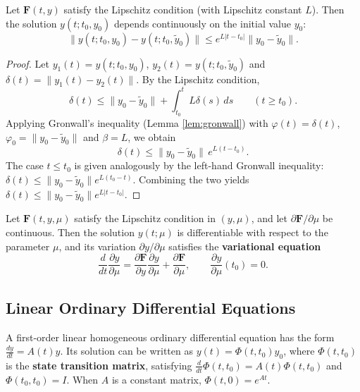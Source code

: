 \begin{proposition}\label{prop:continuous_dependence}
Let $\mathbf{F}(t, y)$ satisfy the Lipschitz condition (with Lipschitz constant $L$). Then the solution $y(t; t_0, y_0)$ depends continuously on the initial value $y_0$:
\[
\|y(t; t_0, y_0) - y(t; t_0, \tilde{y}_0)\| \le e^{L|t-t_0|} \|y_0 - \tilde{y}_0\|.
\]
\end{proposition}

\begin{proof}
Let $y_1(t) = y(t; t_0, y_0)$, $y_2(t) = y(t; t_0, \tilde{y}_0)$ and $\delta(t) = \|y_1(t) - y_2(t)\|$. By the Lipschitz condition,
\[
\delta(t) \le \|y_0 - \tilde{y}_0\| + \int_{t_0}^t L\delta(s)\,ds \qquad (t \ge t_0).
\]
Applying Gronwall's inequality (Lemma \ref{lem:gronwall}) with $\varphi(t) = \delta(t)$, $\varphi_0 = \|y_0 - \tilde{y}_0\|$ and $\beta = L$, we obtain
\[
\delta(t) \le \|y_0 - \tilde{y}_0\|\, e^{L(t-t_0)}.
\]
The case $t \le t_0$ is given analogously by the left-hand Gronwall inequality: $\delta(t) \le \|y_0 - \tilde{y}_0\| e^{L(t_0-t)}$. Combining the two yields $\delta(t) \le \|y_0 - \tilde{y}_0\| e^{L|t-t_0|}$.
\end{proof}

\begin{property}\label{prop:solution_smooth_dependence}
Let $\mathbf{F}(t, y, \mu)$ satisfy the Lipschitz condition in $(y, \mu)$, and let $\partial \mathbf{F}/\partial \mu$ be continuous. Then the solution $y(t; \mu)$ is differentiable with respect to the parameter $\mu$, and its variation $\partial y/\partial \mu$ satisfies the \textbf{variational equation}
\[
\frac{d}{dt}\frac{\partial y}{\partial \mu} = \frac{\partial \mathbf{F}}{\partial y}\frac{\partial y}{\partial \mu} + \frac{\partial \mathbf{F}}{\partial \mu}, \qquad \frac{\partial y}{\partial \mu}(t_0) = 0.
\]
\end{property}

\subsection{Linear Ordinary Differential Equations}

\begin{definition}\label{def:linear_homogeneous_ode}
A first-order linear homogeneous ordinary differential equation has the form $\frac{dy}{dt} = A(t) y$. Its solution can be written as $y(t) = \Phi(t, t_0) y_0$, where $\Phi(t, t_0)$ is the \textbf{state transition matrix}, satisfying $\frac{d}{dt}\Phi(t, t_0) = A(t)\Phi(t, t_0)$ and $\Phi(t_0, t_0) = I$. When $A$ is a constant matrix, $\Phi(t, 0) = e^{At}$.
\end{definition}

